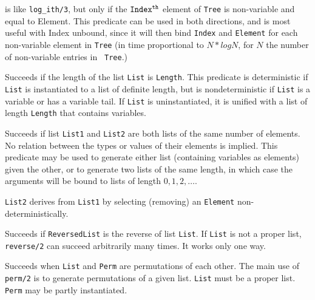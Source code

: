 \begin{description}
    is like {\tt log\_ith/3}, but only if the ${\tt Index^{th}}$ element
    of {\tt Tree} is non-variable and equal to Element.  This predicate
    can be used in both directions, and is most useful with Index
    unbound, since it will then bind {\tt Index} and {\tt Element} for
    each non-variable element in {\tt Tree} (in time proportional to
    $N*logN$, for $N$ the number of non-variable entries in {\tt
    Tree}.)

    Succeeds if the length of the list {\tt List} is {\tt Length}.
    This predicate is deterministic if {\tt List} is instantiated 
    to a list of definite length, but is nondeterministic if 
    {\tt List} is a variable or has a variable tail.  If {\tt List}
    is uninstantiated, it is unified with a list of length {\tt Length}
    that contains variables.

    Succeeds if list {\tt List1} and {\tt List2} are both lists of
    the same number of elements.  No relation between the types or
    values of their elements is implied.  This predicate may be used
    to generate either list (containing variables as elements) given
    the other, or to generate two lists of the same length, in which
    case the arguments will be bound to lists of length $0,1,2,\ldots$.

    {\tt List2} derives from {\tt List1} by selecting (removing) an 
    {\tt Element} non-deterministically.

    Succeeds if {\tt ReversedList} is the reverse of list {\tt List}.
    If {\tt List} is not a proper list, {\tt reverse/2} can succeed
    arbitrarily many times.  It works only one way.

    Succeeds when {\tt List} and {\tt Perm} are permutations of each
    other.  The main use of {\tt perm/2} is to generate permutations
    of a given list.  {\tt List} must be a proper list.
    {\tt Perm} may be partly instantiated.


\end{description}
